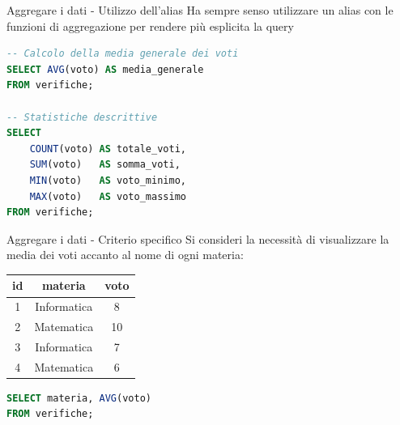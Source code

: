\documentclass{beamer}
\begin{document}
\begin{frame}[fragile]{Aggregare i dati - Utilizzo dell'alias}
Ha sempre senso utilizzare un alias con le funzioni di aggregazione per rendere più esplicita la query

\begin{lstlisting}[language=SQL]
-- Calcolo della media generale dei voti
SELECT AVG(voto) AS media_generale
FROM verifiche;

-- Statistiche descrittive
SELECT 
    COUNT(voto) AS totale_voti,
    SUM(voto)   AS somma_voti,
    MIN(voto)   AS voto_minimo,
    MAX(voto)   AS voto_massimo
FROM verifiche;
\end{lstlisting}

\end{frame}


\begin{frame}[fragile]{Aggregare i dati - Criterio specifico}
Si consideri la necessità di visualizzare la media dei voti accanto al nome di ogni materia:

\begin{center}
\begin{tabular}{|c|c|c|}
\hline
\textbf{id} & \textbf{materia} & \textbf{voto} \\ \hline
1 & Informatica & 8 \\ \hline
2 & Matematica  & 10 \\ \hline
3 & Informatica & 7 \\ \hline
4 & Matematica  & 6 \\ \hline
\end{tabular}
\end{center}

\medskip
\begin{lstlisting}[language=SQL]
SELECT materia, AVG(voto) 
FROM verifiche;
\end{lstlisting}

\end{frame}
\end{document}
